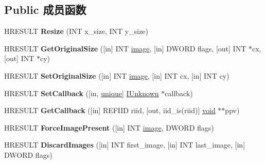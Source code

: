 \subsection*{Public 成员函数}
\begin{DoxyCompactItemize}
\item 
\mbox{\label{interface_i_image_list2_a514a7d7bcc81a57e9b8edd443aa8d333}} 
H\+R\+E\+S\+U\+LT {\bfseries Resize} (I\+NT x\+\_\+size, I\+NT y\+\_\+size)
\item 
\mbox{\label{interface_i_image_list2_a9641d3b55100c9c2a7269cbf75a8d993}} 
H\+R\+E\+S\+U\+LT {\bfseries Get\+Original\+Size} (\mbox{[}in\mbox{]} I\+NT \hyperlink{interfacevoid}{image}, \mbox{[}in\mbox{]} D\+W\+O\+RD flags, \mbox{[}out\mbox{]} I\+NT $\ast$cx, \mbox{[}out\mbox{]} I\+NT $\ast$cy)
\item 
\mbox{\label{interface_i_image_list2_ac14e61ce48ed4fe5a8f6fd2e69f6ddc2}} 
H\+R\+E\+S\+U\+LT {\bfseries Set\+Original\+Size} (\mbox{[}in\mbox{]} I\+NT \hyperlink{interfacevoid}{image}, \mbox{[}in\mbox{]} I\+NT cx, \mbox{[}in\mbox{]} I\+NT cy)
\item 
\mbox{\label{interface_i_image_list2_a9299d39dbe88d254ef7809b16472d021}} 
H\+R\+E\+S\+U\+LT {\bfseries Set\+Callback} (\mbox{[}in, \hyperlink{interfaceunique}{unique}\mbox{]} \hyperlink{interface_i_unknown}{I\+Unknown} $\ast$callback)
\item 
\mbox{\label{interface_i_image_list2_a5802ce96497fd78526889581681114da}} 
H\+R\+E\+S\+U\+LT {\bfseries Get\+Callback} (\mbox{[}in\mbox{]} R\+E\+F\+I\+ID riid, \mbox{[}out, iid\+\_\+is(riid)\mbox{]} \hyperlink{interfacevoid}{void} $\ast$$\ast$ppv)
\item 
\mbox{\label{interface_i_image_list2_ab5d64e7d56c7891aad769bf1ca3f2151}} 
H\+R\+E\+S\+U\+LT {\bfseries Force\+Image\+Present} (\mbox{[}in\mbox{]} I\+NT \hyperlink{interfacevoid}{image}, D\+W\+O\+RD flags)
\item 
\mbox{\label{interface_i_image_list2_aabd68e3940582b11080874546cf6899b}} 
H\+R\+E\+S\+U\+LT {\bfseries Discard\+Images} (\mbox{[}in\mbox{]} I\+NT first\+\_\+image, \mbox{[}in\mbox{]} I\+NT last\+\_\+image, \mbox{[}in\mbox{]} D\+W\+O\+RD flags)
$$
\end{DoxyCompactItemize}
